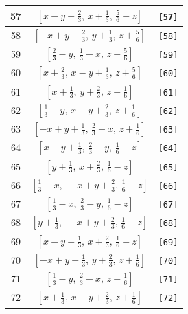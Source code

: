 \documentclass[fleqn,8pt]{jsarticle}
\begin{document}
\begin{longtable}{ccc}
57 & $\left[ x - y + \frac{2}{3},\, x + \frac{1}{3},\, \frac{5}{6} - z \right]$ & {\tt [57]} \\ \hline
58 & $\left[ - x + y + \frac{2}{3},\, y + \frac{1}{3},\, z + \frac{5}{6} \right]$ & {\tt [58]} \\ \hline
59 & $\left[ \frac{2}{3} - y,\, \frac{1}{3} - x,\, z + \frac{5}{6} \right]$ & {\tt [59]} \\ \hline
60 & $\left[ x + \frac{2}{3},\, x - y + \frac{1}{3},\, z + \frac{5}{6} \right]$ & {\tt [60]} \\ \hline
61 & $\left[ x + \frac{1}{3},\, y + \frac{2}{3},\, z + \frac{1}{6} \right]$ & {\tt [61]} \\ \hline
62 & $\left[ \frac{1}{3} - y,\, x - y + \frac{2}{3},\, z + \frac{1}{6} \right]$ & {\tt [62]} \\ \hline
63 & $\left[ - x + y + \frac{1}{3},\, \frac{2}{3} - x,\, z + \frac{1}{6} \right]$ & {\tt [63]} \\ \hline
64 & $\left[ x - y + \frac{1}{3},\, \frac{2}{3} - y,\, \frac{1}{6} - z \right]$ & {\tt [64]} \\ \hline
65 & $\left[ y + \frac{1}{3},\, x + \frac{2}{3},\, \frac{1}{6} - z \right]$ & {\tt [65]} \\ \hline
66 & $\left[ \frac{1}{3} - x,\, - x + y + \frac{2}{3},\, \frac{1}{6} - z \right]$ & {\tt [66]} \\ \hline
67 & $\left[ \frac{1}{3} - x,\, \frac{2}{3} - y,\, \frac{1}{6} - z \right]$ & {\tt [67]} \\ \hline
68 & $\left[ y + \frac{1}{3},\, - x + y + \frac{2}{3},\, \frac{1}{6} - z \right]$ & {\tt [68]} \\ \hline
69 & $\left[ x - y + \frac{1}{3},\, x + \frac{2}{3},\, \frac{1}{6} - z \right]$ & {\tt [69]} \\ \hline
70 & $\left[ - x + y + \frac{1}{3},\, y + \frac{2}{3},\, z + \frac{1}{6} \right]$ & {\tt [70]} \\ \hline
71 & $\left[ \frac{1}{3} - y,\, \frac{2}{3} - x,\, z + \frac{1}{6} \right]$ & {\tt [71]} \\ \hline
72 & $\left[ x + \frac{1}{3},\, x - y + \frac{2}{3},\, z + \frac{1}{6} \right]$ & {\tt [72]} \\
\end{longtable}
\end{document}
